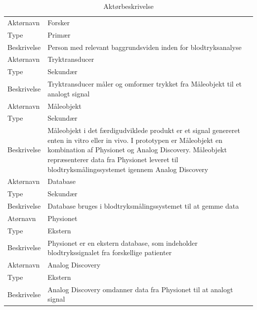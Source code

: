 \begin{table}[H]
\begin{tabularx}{\textwidth}{l X}
     Aktørnavn & Forsker \\
     Type & Primær \\
     Beskrivelse  & Person med relevant baggrundsviden inden for blodtryksanalyse \\ 
     \midrule
     Aktørnavn & Tryktransducer \\
     Type & Sekundær \\
     Beskrivelse  & Tryktransducer måler og omformer trykket fra Måleobjekt til et analogt signal \\ 
     \midrule
     Aktørnavn & Måleobjekt  \\
     Type & Sekundær \\
     Beskrivelse  & Måleobjekt i det færdigudviklede produkt er et signal genereret enten in vitro eller in vivo. I prototypen er Måleobjekt en kombination af Physionet og Analog Discovery. Måleobjekt repræsenterer data fra Physionet leveret til blodtryksmålingssystemet igennem Analog Discovery \\
     \midrule
     Aktørnavn & Database \\
     Type & Sekundær \\
     Beskrivelse  & Database bruges i blodtryksmålingssystemet til at gemme data \\ 
     \midrule
     Atørnavn & Physionet \\
     Type & Ekstern  \\
     Beskrivelse  & Physionet er en ekstern database, som indeholder blodtrykssignalet fra forskellige patienter \\
     \midrule
     Aktørnavn & Analog Discovery  \\
     Type & Ekstern \\
     Beskrivelse  & Analog Discovery omdanner data fra Physionet til at analogt signal \\                                                                                                                                                                          
     \bottomrule                                                                                                                   
    \end{tabularx}
    \caption {Aktørbeskrivelse}
    \label{tab:aktoerbeskrivelse}
	
\end{table}

